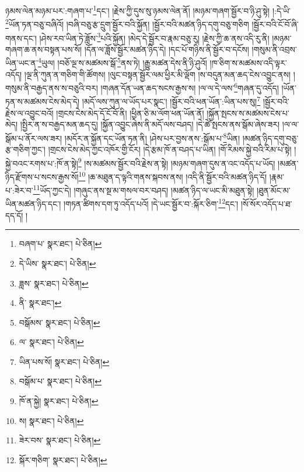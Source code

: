 ཉམས་ལེན་མཉམ་པར་:གཞག་པ་\footnote{བཞག་པ་  སྣར་ཐང་།  པེ་ཅིན། }དང་། །རྗེས་ཀྱི་དུས་སུ་ཉམས་ལེན་ནོ། །མཉམ་གཞག་སྦྱོར་བ་ཉི་ཤུ་སྟེ། །:དེ་ཡི་\footnote{དེ་ཡིས་  སྣར་ཐང་།  པེ་ཅིན། }ཡོན་ཏན་བཅུ་བཞིའོ། །བཞི་བཅུ་རྩ་དྲུག་སྦྱོར་བའི་སྐྱོན། །སྦྱོར་བའི་མཚན་ཉིད་དགུ་བཅུ་གཅིག །སྦྱོར་བའི་ངོ་བོ་ཞི་གནས་དང་། །ཤེས་རབ་ཡིན་ཏེ་ཟློས་\footnote{ཟླས་  སྣར་ཐང་།  པེ་ཅིན། }པའི་སྐྱོན། །མེད་དེ་སྦྱོར་བ་རྣམ་བཅུ་རུ། །རྗེས་ཀྱི་ཆ་ནས་འདི་རུ་ནི། །མཉམ་གཞག་ཆ་ནས་བསྟན་པས་སོ། །དོན་ལ་ཟློས་སྦྱོར་མཚན་ཉིད་དེ། །དང་པོ་གཉིས་ནི་སྦྱོར་བ་དངོས། །གསུམ་ནི་འབྲས་ཡིན་ཡང་ན་\footnote{ནི་  སྣར་ཐང་། }ཡུལ། །བཅོ་ལྔ་ས་མཚམས་སྒོ་\footnote{བསྒོམས་  སྣར་ཐང་།  པེ་ཅིན། }ནས་ཏེ། །རྒྱུ་མཚན་དེས་ནི་ཉི་ཤུའོ། །ཁ་ཅིག་ས་མཚམས་འདི་ལྟར་འདོད། །ལྔ་ནི་ཀུན་ན་གཅིག་གི་ཚོགས། །ལུང་བསྟན་སྦྱོར་ལམ་ཕྱིར་མི་ལྡོག །ས་བདུན་མན་ཆད་ངེས་འབྱུང་ནས། །གསུམ་ནི་བརྒྱད་ནས་ས་བཅུའི་བར། །གཞན་དོན་ཡན་ཆད་སངས་རྒྱས་ས། །ལ་ལ་དེ་ལས་\footnote{ལ་  སྣར་ཐང་།  པེ་ཅིན། }གཞན་དུ་འདོད། །ཡོན་ཏན་ས་མཚམས་ངེས་མེད་དེ། །མདོ་ལས་ཀུན་ལ་ཡོད་པར་སྣང་། །སྦྱོར་བའི་ཕན་ཡོན་:ཡིན་པས་སུ།\footnote{ཡིན་པས་སོ།  སྣར་ཐང་།  པེ་ཅིན། } །སྦྱོར་བའི་རྗེས་ལ་འབྱུང་བའོ། །གྲངས་ངེས་མེད་དོ་ངོ་བོ་ནི། །ཕྱིན་ཅི་མ་ལོག་ཕན་ཡོན་ནོ། །སྐྱོན་སྤངས་ས་མཚམས་ངེས་པ་མེད། །སྤྱིར་ན་ས་བརྒྱད་མན་ཆད་དུ། །སྐྱོན་འབྱུང་ཞེས་ནི་མདོ་ལས་བཤད། །དེ་ཚེ་སྤངས་ནས་སྒོམ་ཞེས་ཟར། །ལ་ལ་སྒོམ་པ་ནོར་ལས་ཟར། །མདོར་ན་སྐྱོན་དང་ཡོན་ཏན་ནི། །ཤེས་པར་བྱས་ནས་:སྒོམ་པ་\footnote{བསྒོམ་པ་  སྣར་ཐང་།  པེ་ཅིན། }ཡིན། །མཚན་ཉིད་དགུ་བཅུ་རྩ་གཅིག་ཀྱང་། །གྲངས་ངེས་མེད་ཀྱང་འཁོར་གྱི་ངོར། །དེ་རྩམ་ཁོ་ན་བཤད་པ་ཡིན། །གོ་རིམས་སྐྱེ་བའི་རིམ་པ་སྟེ། །སྐྱེ་བའང་རགས་པ་:ཁོ་ན་སྟེ།\footnote{ཁོ་ན་སྐྱེ།  སྣར་ཐང་།  པེ་ཅིན། } །ས་མཚམས་སྦྱོར་བའི་རྗེས་ན་སྟེ། །མཉམ་གཞག་དུས་ན་འང་འདོད་པ་ཡོད། །མཚན་ཉིད་རྫོགས་པ་སངས་རྒྱས་སོ།\footnote{ས།  སྣར་ཐང་།  པེ་ཅིན། } །ཆ་མཐུན་ད་ལྟའི་གནས་སྐབས་ནས། །འདི་ནི་སྦྱོར་བའི་མཚན་ཉིད་དོ། །རྣམ་པ་:ཟེར་བ་\footnote{ཟེར་བས་  སྣར་ཐང་།  པེ་ཅིན། }ཡོད་ཀྱང་དེ། །གཞུང་ནས་སྔ་མ་གསལ་བར་བཤད། །མཚན་ཉིད་ལ་ཡང་མི་མཐུན་སྟེ། །ཐུན་མོང་མ་ཡིན་མཚན་ཉིད་དང་། །གཏན་ཚིགས་དག་ཏུ་འདོད་པའོ། །དེ་ཡང་སྦྱོར་བ་:སྐོར་ཅིག་\footnote{སྐོར་གཅིག་  སྣར་ཐང་།  པེ་ཅིན། }དང་། །སོ་སོར་འདོད་པ་ཐ་དད་དོ། །
